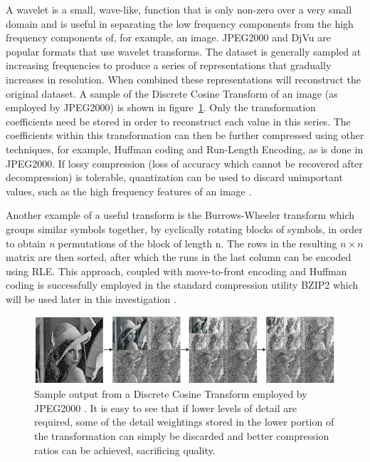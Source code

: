 A wavelet is a small, wave-like, function that is only non-zero over a very small domain and is useful in separating the low frequency components from the high frequency components of, 
for example, an image. JPEG2000 and DjVu are popular formats that use wavelet transforms. The dataset is generally sampled at increasing frequencies to produce a series of representations 
that gradually increases in resolution. When combined these representations will reconstruct the original dataset. A sample of the Discrete Cosine Transform of an image (as employed by JPEG2000) 
is shown in figure~\ref{TRANSFORM_SAMPLE}. Only the transformation coefficients need be stored in order to reconstruct each value in this series. The coefficients within this transformation 
can then be further compressed using other techniques, for example, Huffman coding and Run-Length Encoding, as is done in JPEG2000. If lossy compression (loss of accuracy which cannot be recovered after 
decompression) is tolerable, quantization can be used to discard unimportant values, such as the high frequency features of an image \cite{952804}\cite[ch. 5]{salomon2004data}.

Another example of a useful transform is the Burrows-Wheeler transform which groups similar symbols together, by cyclically rotating blocks of symbols, in order to 
obtain \textit{n} permutations of the block of length n. The rows in the resulting $n\times n$ matrix are then sorted, after which the runs in the last column can be encoded using RLE. This approach, coupled
with move-to-front encoding and Huffman coding is successfully employed in the standard compression utility BZIP2 which will be used later in this investigation \cite[ch. 8]{salomon2004data}\cite{seward1996bzip2}.
\begin{figure}[h!]
\begin{mdframed}
 \centering
 \includegraphics[width=1.0\textwidth]{DCTSample.png}
 \caption[Discrete Cosine Transform example]{Sample output from a Discrete Cosine Transform employed by JPEG2000 \cite{952804}. It is easy to see that if lower levels of detail are required, some of the detail weightings stored in
 the lower portion of the transformation can simply be discarded and better compression ratios can be achieved, sacrificing quality.}
 \label{TRANSFORM_SAMPLE}
\end{mdframed}
\end{figure}

